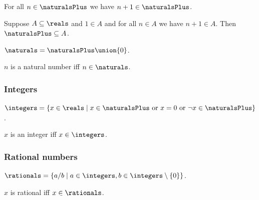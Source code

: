 \begin{axiom}\label{real_naturals_closed_succ}
    For all $n\in\naturalsPlus$ we have $n + 1\in\naturalsPlus$.
\end{axiom} 

\begin{axiom}\label{real_naturals_smallest}
    Suppose $A\subseteq\reals$ and $1\in A$ and for all $n\in A$ we have $n + 1\in A$.
    Then $\naturalsPlus \subseteq A$.
\end{axiom}

\begin{definition}\label{naturals}
      $\naturals = \naturalsPlus \union \{0\}$.
\end{definition}

\begin{abbreviation}\label{num_naturalnumber}
    $n$ is a natural number iff $n\in \naturals$.
\end{abbreviation}

\subsubsection{Integers}
 
\begin{definition}\label{real_integers}
  $\integers = \{x \in \reals \mid \text{$x \in \naturalsPlus$ or $x=0$ or $\neg{x} \in \naturalsPlus$}\}$.
\end{definition}

\begin{abbreviation}\label{real_integer}
    $x$ is an integer iff $x\in\integers$.
\end{abbreviation}

\subsubsection{Rational numbers}

\begin{definition}\label{real_rationals}
    $\rationals = \{ a / b \mid a\in\integers, b\in\integers\setminus\{0\}\}$.
\end{definition}

\begin{abbreviation}\label{real_rational}
    $x$ is rational iff $x\in\rationals$.
\end{abbreviation}

